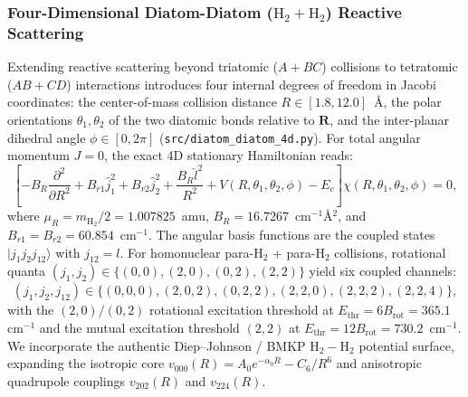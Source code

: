 \documentclass[11pt,a4paper]{article}
\newcommand{\cmi}{\ensuremath{\mathrm{cm}^{-1}}}
\begin{document}
\subsubsection{Four-Dimensional Diatom-Diatom ($\mathrm{H}_2 + \mathrm{H}_2$) Reactive Scattering}
Extending reactive scattering beyond triatomic ($A + BC$) collisions to tetratomic ($AB + CD$) interactions introduces four internal degrees of freedom in Jacobi coordinates: the center-of-mass collision distance $R \in [1.8, 12.0]$~\AA, the polar orientations $\theta_1, \theta_2$ of the two diatomic bonds relative to $\mathbf{R}$, and the inter-planar dihedral angle $\phi \in [0, 2\pi]$ (\texttt{src/}\allowbreak\texttt{diatom\_diatom\_4d.py}).
For total angular momentum $J = 0$, the exact 4D stationary Hamiltonian reads:
\begin{equation}
 \left[ -B_R \frac{\partial^2}{\partial R^2} + B_{r1} \hat j_1^2 + B_{r2} \hat j_2^2 + \frac{B_R \hat l^2}{R^2} + V(R, \theta_1, \theta_2, \phi) - E_c \right] \chi(R, \theta_1, \theta_2, \phi) = 0 ,
\end{equation}
where $\mu_R = m_{\mathrm{H}_2} / 2 = 1.007825$~amu, $B_R = 16.7267$~\cmi\AA$^2$, and $B_{r1} = B_{r2} = 60.854$~\cmi. The angular basis functions are the coupled states $|j_1 j_2 j_{12}\rangle$ with $j_{12} = l$. For homonuclear para-$\mathrm{H}_2$ + para-$\mathrm{H}_2$ collisions, rotational quanta $(j_1, j_2) \in \{(0, 0), (2, 0), (0, 2), (2, 2)\}$ yield six coupled channels:
\begin{equation}
 (j_1, j_2, j_{12}) \in \{ (0, 0, 0), (2, 0, 2), (0, 2, 2), (2, 2, 0), (2, 2, 2), (2, 2, 4) \} ,
\end{equation}
with the $(2, 0)/(0, 2)$ rotational excitation threshold at $E_{\mathrm{thr}} = 6 B_{\mathrm{rot}} = 365.1$~\cmi{} and the mutual excitation threshold $(2, 2)$ at $E_{\mathrm{thr}} = 12 B_{\mathrm{rot}} = 730.2$~\cmi. We incorporate the authentic Diep--Johnson / BMKP $\mathrm{H}_2 - \mathrm{H}_2$ potential surface, expanding the isotropic core $v_{000}(R) = A_0 e^{-\alpha_0 R} - C_6 / R^6$ and anisotropic quadrupole couplings $v_{202}(R)$ and $v_{224}(R)$.
\end{document}
